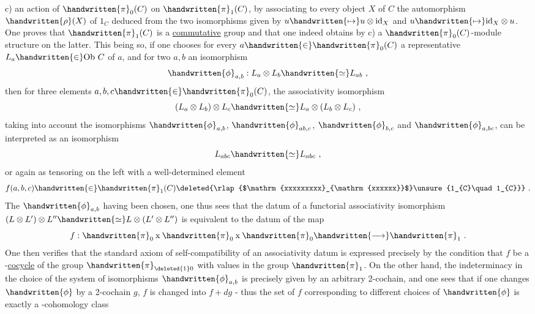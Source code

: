 c) an action of $\handwritten{\pi}_{0}(C)$ on $\handwritten{\pi}_{1}(C)$, by associating to every object $X$ of $C$ the automorphism  $\handwritten{\rho}(X)$ of $1_C$ deduced from the two isomorphisms
given by $u\handwritten{\mapsto}u\otimes\mathrm{id}_{X}$ and $u\handwritten{\mapsto}\mathrm{id}_{X}\otimes u$. One proves that $\handwritten{\pi}_{1}(C)$ is a \uline{commutative} group and that one indeed obtains by c) a $\handwritten{\pi}_{0}(C)$-module structure on the latter. This being so, if one chooses for every $a\handwritten{\in}\handwritten{\pi}_{0}(C)$ a representative $L_{a}\handwritten{\in}\mathrm{Ob}\ C$ of $a$, and for two  $a,b$ an isomorphism
\[
\handwritten{\phi}_{a,b}: L_a\otimes L_b\handwritten{\simeq}L_{ab}\ , 
\]
then for three elements $a,b,c\handwritten{\in}\handwritten{\pi}_{0}(C)$, the associativity isomorphism
\[
(L_a\otimes L_b)\otimes L_c\handwritten{\simeq}L_a\otimes(L_b\otimes L_c)\ ,
\]
taking into account the isomorphisms $\handwritten{\phi}_{a,b}$, $\handwritten{\phi}_{ab,c}$, $\handwritten{\phi}_{b,c}$ and $\handwritten{\phi}_{a,bc}$, can be interpreted as an isomorphism
\[
L_{abc}\handwritten{\simeq}L_{abc}\ ,
\]
or again as tensoring on the left with a well-determined element
\[
f(a,b,c)\handwritten{\in}\handwritten{\pi}_{1}(C)\deleted{\rlap{$\mathrm{xxxxxxxxx}_{\mathrm{xxxxxx}}$}\unsure{1_{C}\quad 1_{C}}}\ .
\]
The $\handwritten{\phi}_{a,b}$ having been chosen, one thus sees that the datum of a functorial associativity isomorphism $(L\otimes L')\otimes L''\handwritten{\simeq}L\otimes(L'\otimes L'')$ is equivalent to the datum of the map
\[
f:\handwritten{\pi}_{0}\mathbin{\mathrm{x}}\handwritten{\pi}_{0}\mathbin{\mathrm{x}}\handwritten{\pi}_{0}\handwritten{\longrightarrow}\handwritten{\pi}_{1}\ .
\]
One then verifies that the standard axiom  of self-compatibility of an associativity datum  is expressed precisely by the condition that $f$ be a -\uline{cocycle} of the group $\handwritten{\pi}_{\deleted{1}0}$ with values in the group $\handwritten{\pi}_{1}$. On the other hand, the indeterminacy in the choice of the system of isomorphisms $\handwritten{\phi}_{a,b}$ is precisely given by an arbitrary 2-cochain, and one sees that if one changes $\handwritten{\phi}$ by a 2-cochain $g$, $f$ is changed into $f+dg$ - thus the set of $f$ corresponding to different choices of $\handwritten{\phi}$ is exactly a -cohomology class
